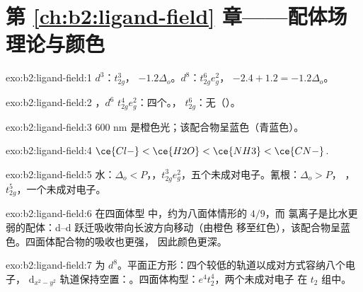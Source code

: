 \section*{第 \ref{ch:b2:ligand-field} 章——配体场理论与颜色}

\begin{solution}{exo:b2:ligand-field:1}
$d^3$：$t_{2g}^3$， $-1.2\Delta_o$。$d^8$：$t_{2g}^6e_g^2$， $-2.4 + 1.2 = -1.2\Delta_o$。
\end{solution}

\begin{solution}{exo:b2:ligand-field:2}
，$d^6$  $t_{2g}^4e_g^2$：四个。，
$t_{2g}^6$：无（）。
\end{solution}

\begin{solution}{exo:b2:ligand-field:3}
600 nm 是橙色光；该配合物呈蓝色（青蓝色）。
\end{solution}

\begin{solution}{exo:b2:ligand-field:4}
$\ce{Cl-} < \ce{H2O} < \ce{NH3} < \ce{CN-}$.
\end{solution}

\begin{solution}{exo:b2:ligand-field:5}
水：$\Delta_o < P$，，$t_{2g}^3e_g^2$，五个未成对电子。氰根：$\Delta_o > P$，
，$t_{2g}^5$，一个未成对电子。
\end{solution}

\begin{solution}{exo:b2:ligand-field:6}
在四面体型  中，约为八面体情形的 $4/9$，而
氯离子是比水更弱的配体：d–d 跃迁吸收带向长波方向移动（由橙色
移至红色），该配合物呈蓝色。四面体配合物的吸收也更强，
因此颜色更深。
\end{solution}

\begin{solution}{exo:b2:ligand-field:7}
 为 $d^8$。平面正方形：四个较低的轨道以成对方式容纳八个电子，
$\mathrm d_{x^2-y^2}$ 轨道保持空置：。四面体构型：$e^4t_2^4$，两个未成对电子
在 $t_2$ 组中。
\end{solution}

